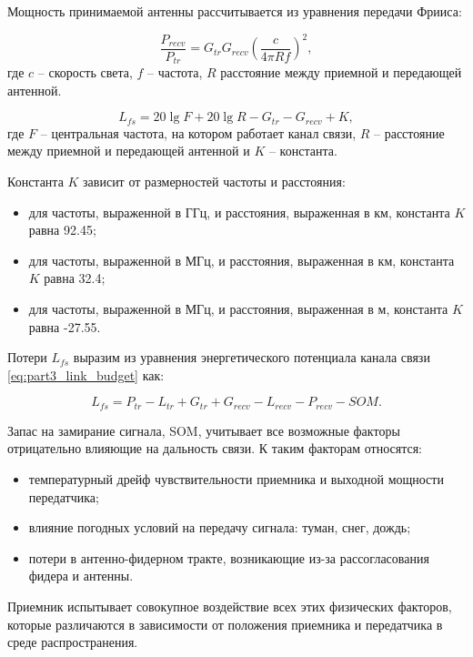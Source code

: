 
Мощность принимаемой антенны рассчитывается из уравнения передачи Фрииса:

\begin{equation}
  \label{eq:part1_Friis}
  \frac{P_{recv}}{P_{tr}} = G_{tr}G_{recv}\left(\frac{c}{4\pi R f} \right)^2,
\end{equation}
где
$c$ --  скорость света,
$f$ -- частота, 
$R$ расстояние между приемной и передающей антенной.

\begin{equation}
  \label{eq:part3_L_fs}
  L_{fs} = 20 \lg{F} + 20\lg{R} - G_{tr} - G_{recv} + K,
  \end{equation}
где $F$ -- центральная частота, на котором работает канал связи, $R$ -- расстояние между приемной и передающей антенной и $K$ -- константа.

Константа $K$ зависит от размерностей частоты и расстояния:

\begin{itemize}
  \item для частоты, выраженной в ГГц, и расстояния, выраженная в км, константа $K$ равна 92.45;
  \item для частоты, выраженной в МГц, и расстояния, выраженная в км, константа $K$ равна 32.4;
  \item для частоты, выраженной в МГц, и расстояния, выраженная в м, константа $K$ равна -27.55.
\end{itemize} 

Потери $L_{fs}$ выразим из уравнения энергетического потенциала канала связи \cref{eq:part3_link_budget} как:

\begin{equation}
  \label{eq:part3_L_fs_from_link_budget}
  L_{fs} = P_{tr} - L_{tr} + G_{tr} + G_{recv} - L_{recv} - P_{recv} - SOM.
\end{equation}


Запас на замирание сигнала, SOM,  учитывает все возможные факторы отрицательно влияющие на дальность связи. К таким факторам относятся:

\begin{itemize}
  \item температурный дрейф чувствительности приемника и выходной мощности передатчика;
  \item влияние погодных условий на передачу сигнала: туман, снег, дождь;
  \item  потери в антенно-фидерном тракте, возникающие из-за рассогласования фидера и антенны.
\end{itemize}
Приемник испытывает совокупное воздействие всех этих физических факторов, которые различаются в зависимости от положения приемника и передатчика в среде распространения. 

